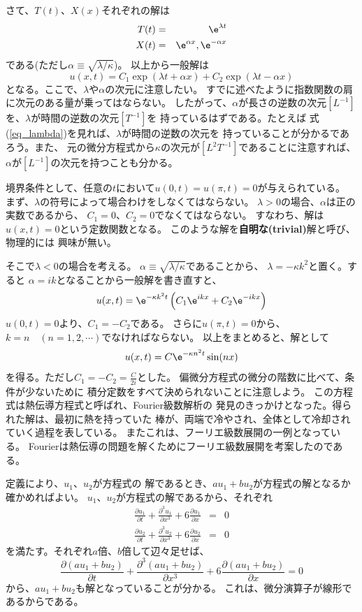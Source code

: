 さて、$T(t)$、$X(x)$それぞれの解は
\begin{eqnarray}
  T(t) &=& \e^{\lambda t}\\
  X(t) &=& \e^{\alpha x}, \e^{- \alpha x}
\end{eqnarray}
である(ただし$\alpha \equiv \sqrt{\lambda/\kappa}$)。
以上から一般解は
$$
  u(x,t) = C_1 \exp{(\lambda t + \alpha x)} + C_2 \exp{(\lambda t - \alpha x)}
$$
となる。ここで、$\lambda$や$\alpha$の次元に注意したい。
すでに述べたように指数関数の肩に次元のある量が乗ってはならない。
したがって、$\alpha$が長さの逆数の次元$[L^{-1}]$を、$\lambda$が時間の逆数の次元$[T^{-1}]$を
持っているはずである。たとえば
式(\ref{eq_lambda})を見れば、$\lambda$が時間の逆数の次元を
持っていることが分かるであろう。また、
元の微分方程式から$\kappa$の次元が$[L^2 T^{-1}]$であることに注意すれば、
$\alpha$が$[L^{-1}]$の次元を持つことも分かる。

境界条件として、任意の$t$において$u(0,t) = u(\pi,t) = 0$が与えられている。
まず、$\lambda$の符号によって場合わけをしなくてはならない。
$\lambda>0$の場合、$\alpha$は正の実数であるから、
$C_1 = 0$、$C_2 = 0$でなくてはならない。
すなわち、解は$u(x,t)=0$という定数関数となる。
このような解を{\bf 自明な(trivial)}解と呼び、物理的には
興味が無い。

そこで$\lambda <0$の場合を考える。
$\alpha \equiv \sqrt{\lambda/\kappa}$であることから、
$\lambda = -\kappa k^2$と置く。すると
$\alpha = i k$となることから一般解を書き直すと、
$$
  u(x,t) = \e^{- \kappa k^2 t}
  \left(
  C_1 \e^{ikx} +
  C_2 \e^{-ikx}
  \right)
$$
$u(0,t) = 0$より、$C_1 = - C_2$である。
さらに$u(\pi,t) = 0$から、$k = n \quad (n = 1,2,\cdots)$でなければならない。
以上をまとめると、解として
$$u(x,t) = C \e^{- \kappa n^2 t} \sin(nx)$$
を得る。ただし$C_1 = - C_2 = \displaystyle\frac{C}{2i}$とした。
偏微分方程式の微分の階数に比べて、条件が少ないために
積分定数をすべて決められないことに注意しよう。
この方程式は熱伝導方程式と呼ばれ、Fourier級数解析の
発見のきっかけとなった。得られた解は、最初に熱を持っていた
棒が、両端で冷やされ、全体として冷却されていく過程を表している。
またこれは、フーリエ級数展開の一例となっている。
Fourierは熱伝導の問題を解くためにフーリエ級数展開を考案したのである。

定義により、$u_1$、$u_2$が方程式の
解であるとき、$au_1 + bu_2$が方程式の解となるか
確かめればよい。
$u_1$、$u_2$が方程式の解であるから、それぞれ
\begin{eqnarray}
  \frac{\partial u_1}{\partial t} +  \frac{\partial^3 u_1}{\partial x^3} + 6  \frac{\partial u_1}{\partial x}  &=& 0\\
  \frac{\partial u_2}{\partial t} +  \frac{\partial^3 u_2}{\partial x^3} + 6  \frac{\partial u_2}{\partial x}  &=& 0
\end{eqnarray}
を満たす。それぞれ$a$倍、$b$倍して辺々足せば、
\begin{equation}
  \frac{\partial (au_1+bu_2)}{\partial t} +  \frac{\partial^3 (au_1+bu_2)}{\partial x^3} + 6  \frac{\partial (au_1+bu_2)}{\partial x}  = 0
\end{equation}
から、$au_1+bu_2$も解となっていることが分かる。
これは、微分演算子が線形であるからである。

